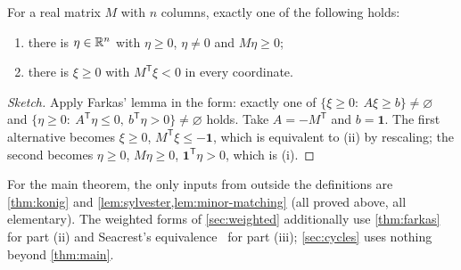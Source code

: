 \begin{theorem}\label{thm:farkas}
For a real matrix $M$ with $n$ columns, exactly one of the following holds:
\begin{enumerate}[label=\textup{(\roman*)},leftmargin=1.6em,itemsep=1pt,topsep=1pt]
\item there is $\eta\in\mathbb R^n$ with $\eta\ge0$, $\eta\ne0$ and $M\eta\ge0$;
\item there is $\xi\ge0$ with $M^{\mathsf T}\xi<0$ in every coordinate.
\end{enumerate}
\end{theorem}

\begin{proof}[Sketch]
Apply Farkas' lemma in the form: exactly one of
$\{\xi\ge0:\ A\xi\ge b\}\ne\varnothing$ and $\{\eta\ge0:\ A^{\mathsf T}\eta\le0,\ b^{\mathsf T}\eta>0\}\ne\varnothing$
holds. Take $A=-M^{\mathsf T}$ and $b=\mathbf 1$. The first alternative becomes
$\xi\ge0$, $M^{\mathsf T}\xi\le-\mathbf 1$, which is equivalent to (ii) by rescaling; the second
becomes $\eta\ge0$, $M\eta\ge0$, $\mathbf 1^{\mathsf T}\eta>0$, which is (i).
\end{proof}

\begin{remark}\label{rem:inputs}
For the main theorem, the only inputs from outside the definitions are \cref{thm:konig} and
\cref{lem:sylvester,lem:minor-matching} (all proved above, all elementary). The weighted forms of
\cref{sec:weighted} additionally use \cref{thm:farkas} for part (ii) and Seacrest's
equivalence~\cite{Seacrest2015} for part (iii); \cref{sec:cycles} uses nothing beyond
\cref{thm:main}.
\end{remark}
